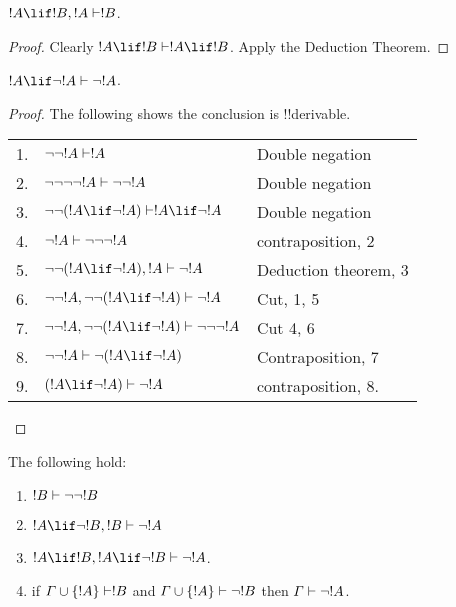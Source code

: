 \documentclass[../../include/open-logic-section]{subfiles}
\begin{document}
\begin{lem}
$!A \lif !B, !A \Proves !B$. 
\end{lem}

\begin{proof} 
Clearly $!A \lif !B \Proves !A\lif !B$. Apply the Deduction Theorem.
\end{proof}

\begin{lem}
$!A \lif \lnot !A \Proves \lnot !A$.
\end{lem}

\begin{proof} 
The following shows the conclusion is !!{derivable}.
  
\begin{tabular}{rll} 
1. & $\lnot\lnot!A \Proves !A$ & Double negation \\ 
2. & $\lnot\lnot \lnot\lnot!A \Proves \lnot\lnot!A$ & Double negation \\ 
3. & $\lnot\lnot(!A \lif \lnot !A) \Proves !A \lif \lnot !A$ & Double negation\\
4. & $\lnot!A \Proves \lnot\lnot\lnot !A$ & contraposition, 2\\ 
5. & $\lnot\lnot(!A \lif \lnot !A), !A \Proves \lnot !A$ & Deduction theorem, 3 \\
6. & $\lnot\lnot!A, \lnot\lnot(!A \lif \lnot !A) \Proves \lnot !A$ & Cut, 1, 5 \\ 
7. & $\lnot\lnot!A, \lnot\lnot(!A \lif \lnot !A) \Proves \lnot\lnot\lnot !A$ & Cut 4, 6 \\ 
8. & $\lnot \lnot !A \Proves \lnot (!A \lif \lnot !A)$ & Contraposition, 7 \\ 
9. & $(!A \lif \lnot !A) \Proves \lnot !A$ & contraposition, 8. 
\end{tabular}
\end{proof}

\begin{prop} 
The following hold:
\begin{enumerate} 
\item $!B \Proves \lnot \lnot !B$ 
\item $!A \lif \lnot !B, !B \Proves \lnot!A$  
\item $!A\lif !B,!A\lif\lnot !B \Proves \lnot!A$.  
\item if $\Gamma \cup \{ !A \}\Proves !B$ and $\Gamma \cup \{ !A\} 
\Proves \lnot !B$ then $\Gamma \Proves \lnot!A$.  
\end{enumerate} 
\end{prop}
\end{document}
